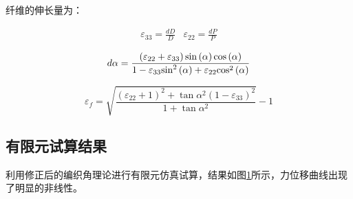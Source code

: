 纤维的伸长量为：

\begin{equation}
\begin{array}{*{20}{c}}
{{\varepsilon _{33}} = \frac{{dD}}{D}}&{{\varepsilon _{22}} = \frac{{dP}}{P}}
\end{array}
\end{equation}

\begin{equation}
d\alpha  = \frac{{\left( {{\varepsilon _{22}} + {\varepsilon _{33}}} \right)\sin \left( \alpha  \right){\rm{cos}}\left( \alpha  \right)}}{{1 - {\varepsilon _{33}}{{\sin }^2}\left( \alpha  \right) + {\varepsilon _{22}}{\rm{co}}{{\rm{s}}^2}\left( \alpha  \right)}}
\end{equation}


\begin{equation}
{\varepsilon _f} = \sqrt {\frac{{{{\left( {{\varepsilon _{22}} + 1} \right)}^2} + \tan {\alpha ^2}{{\left( {1 - {\varepsilon _{33}}} \right)}^2}}}{{1 + \tan {\alpha ^2}}}}  - 1
\end{equation}


\subsection{有限元试算结果}
利用修正后的编织角理论进行有限元仿真试算，结果如图\ref{fig:RUC-MOD}所示，力位移曲线出现了明显的非线性。
\begin{figure}[!htp]
\centering
{}
\label{fig:RUC-MOD}
\end{figure}






